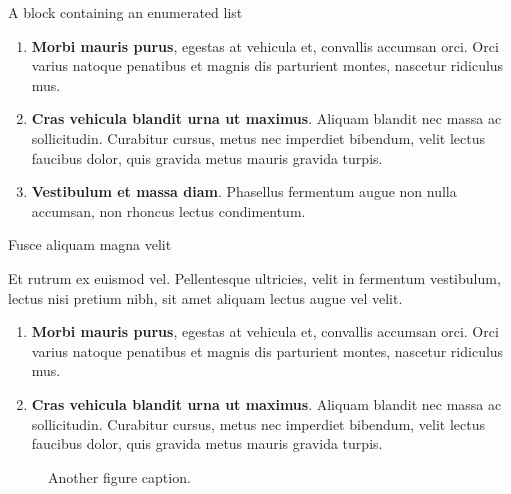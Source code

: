 \documentclass[final]{beamer}
\newlength{\colwidth}
\begin{document}
\begin{frame}[t]
\begin{columns}[t]
\begin{column}{\colwidth}
\begin{defbox}{A block containing an enumerated list}{}
				\begin{enumerate}
					\item \textbf{Morbi mauris purus}, egestas at vehicula et, convallis
					accumsan orci. Orci varius natoque penatibus et magnis dis parturient
					montes, nascetur ridiculus mus.
					\item \textbf{Cras vehicula blandit urna ut maximus}. Aliquam blandit nec
					massa ac sollicitudin. Curabitur cursus, metus nec imperdiet bibendum,
					velit lectus faucibus dolor, quis gravida metus mauris gravida turpis.
					\item \textbf{Vestibulum et massa diam}. Phasellus fermentum augue non
					nulla accumsan, non rhoncus lectus condimentum.
				\end{enumerate}
				
			\end{defbox}
			
			\begin{block}{Fusce aliquam magna velit}
				
				Et rutrum ex euismod vel. Pellentesque ultricies, velit in fermentum
				vestibulum, lectus nisi pretium nibh, sit amet aliquam lectus augue vel
				velit. 
				
				\begin{enumerate}
					\item \textbf{Morbi mauris purus}, egestas at vehicula et, convallis
					accumsan orci. Orci varius natoque penatibus et magnis dis parturient
					montes, nascetur ridiculus mus.
					\item \textbf{Cras vehicula blandit urna ut maximus}. Aliquam blandit nec
					massa ac sollicitudin. Curabitur cursus, metus nec imperdiet bibendum,
					velit lectus faucibus dolor, quis gravida metus mauris gravida turpis.
				\end{enumerate}
				
				\begin{figure}
					\centering
					\caption{Another figure caption.}
				\end{figure}
				

\end{block}
\end{column}
\end{columns}
\end{frame}
\end{document}

